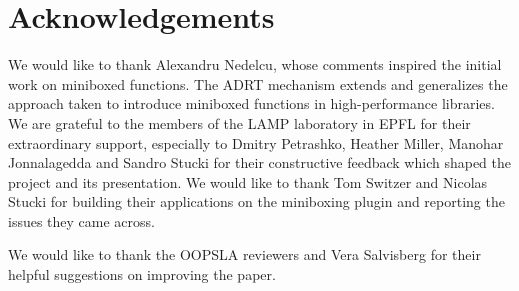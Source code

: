 \section*{Acknowledgements}

We would like to thank Alexandru Nedelcu, whose comments inspired the initial work on miniboxed functions. The ADRT mechanism extends and generalizes the approach taken to introduce miniboxed functions in high-performance libraries. We are grateful to the members of the LAMP laboratory in EPFL for their extraordinary support, especially to Dmitry Petrashko, Heather Miller, Manohar Jonnalagedda and Sandro Stucki for their constructive feedback which shaped the project and its presentation. We would like to thank Tom Switzer and Nicolas Stucki for building their applications on the miniboxing plugin and reporting the issues they came across.

We would like to thank the OOPSLA reviewers and Vera Salvisberg for their helpful suggestions on improving the paper.